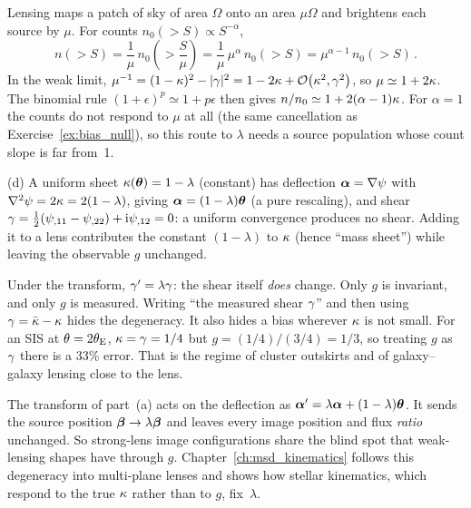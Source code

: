 \begin{derivation}
Lensing maps a patch of sky of area $\Omega$ onto an area $\mu\Omega$ and
brightens each source by $\mu$.  For counts $n_0(>S) \propto S^{-\alpha}$,
\begin{equation*}
    n(>S) = \frac{1}{\mu}\,n_0\!\left(>\frac{S}{\mu}\right)
    = \frac{1}{\mu}\,\mu^{\alpha}\,n_0(>S) = \mu^{\alpha-1}\,n_0(>S)\,.
\end{equation*}
In the weak limit, $\mu^{-1} = (1-\kappa)^2 - |\gamma|^2 = 1 - 2\kappa +
\mathcal{O}\!\left(\kappa^2, \gamma^2\right)$, so $\mu \simeq 1 + 2\kappa$.  The binomial
rule $(1+\epsilon)^p \simeq 1 + p\epsilon$ then gives
$n/n_0 \simeq 1 + 2(\alpha-1)\kappa$.  For $\alpha = 1$ the
counts do not respond to $\mu$ at all (the same cancellation as
Exercise~\ref{ex:bias_null}), so this route to $\lambda$ needs a source
population whose count slope is far from~1.
\end{derivation}

(d) A uniform sheet $\kappa(\boldsymbol{\theta}) = 1-\lambda$ (constant)
has deflection $\boldsymbol{\alpha} = \nabla\psi$ with
$\nabla^2\psi = 2\kappa = 2(1-\lambda)$, giving
$\boldsymbol{\alpha} = (1-\lambda)\boldsymbol{\theta}$ (a pure rescaling), and shear
$\gamma = \tfrac{1}{2}(\psi_{,11} - \psi_{,22}) + \mathrm i\psi_{,12}
= 0$: a uniform convergence produces no shear.  Adding it to a
lens contributes the constant $(1-\lambda)$ to $\kappa$ (hence ``mass
sheet'') while leaving the observable $g$ unchanged. \checkmark

\begin{annotation}
Under the transform, $\gamma' = \lambda\gamma$: the shear itself
\emph{does} change.  Only $g$ is invariant, and only $g$ is measured.  Writing
``the measured shear $\gamma$'' and then using $\gamma = \bar\kappa -
\kappa$ hides the degeneracy.  It also hides a bias wherever $\kappa$ is not
small.  For an SIS at $\theta = 2\theta_{\mathrm{E}}$, $\kappa = \gamma = 1/4$ but
$g = (1/4)/(3/4) = 1/3$, so treating $g$ as $\gamma$ there is a 33\% error.
That is the regime of cluster outskirts and of galaxy--galaxy lensing close to
the lens.
\end{annotation}

\begin{bridge}
The transform of part~(a) acts on the deflection as
$\boldsymbol{\alpha}' = \lambda\boldsymbol{\alpha} + (1-\lambda)\boldsymbol{\theta}$.  It sends the source
position $\boldsymbol{\beta} \to \lambda\boldsymbol{\beta}$ and leaves every image position and
flux \emph{ratio} unchanged.  So strong-lens image configurations share the
blind spot that weak-lensing shapes have through $g$.
Chapter~\ref{ch:msd_kinematics} follows this degeneracy into multi-plane
lenses and shows how stellar kinematics, which respond to the true $\kappa$
rather than to $g$, fix~$\lambda$.
\end{bridge}

